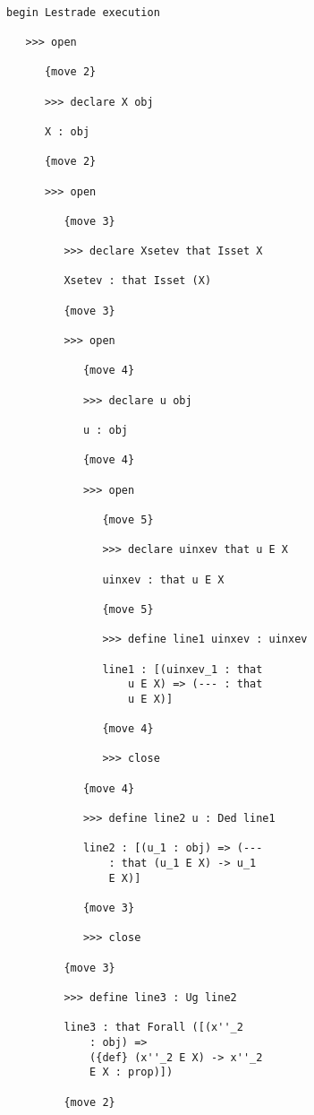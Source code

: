 \documentclass[12pt]{article}
\begin{document}
\begin{verbatim}

begin Lestrade execution

   >>> open

      {move 2}

      >>> declare X obj

      X : obj

      {move 2}

      >>> open

         {move 3}

         >>> declare Xsetev that Isset X

         Xsetev : that Isset (X)

         {move 3}

         >>> open

            {move 4}

            >>> declare u obj

            u : obj

            {move 4}

            >>> open

               {move 5}

               >>> declare uinxev that u E X

               uinxev : that u E X

               {move 5}

               >>> define line1 uinxev : uinxev

               line1 : [(uinxev_1 : that 
                   u E X) => (--- : that 
                   u E X)]

               {move 4}

               >>> close

            {move 4}

            >>> define line2 u : Ded line1

            line2 : [(u_1 : obj) => (--- 
                : that (u_1 E X) -> u_1 
                E X)]

            {move 3}

            >>> close

         {move 3}

         >>> define line3 : Ug line2

         line3 : that Forall ([(x''_2 
             : obj) => 
             ({def} (x''_2 E X) -> x''_2 
             E X : prop)])

         {move 2}


\end{verbatim}
\end{document}
